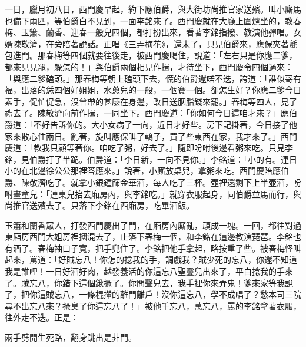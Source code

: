 一日，臘月初八日，西門慶早起，約下應伯爵，與大街坊尚推官家送殯。叫小廝馬也備下兩匹，等伯爵白不見到，一面李銘來了。西門慶就在大廳上圍爐坐的，教春梅、玉簫、蘭香、迎春一般兒四個，都打扮出來，看著李銘指撥、教演他彈唱。女婿陳敬濟，在旁陪著說話。正唱《三弄梅花》，還未了，只見伯爵來，應保夾著氈包進門。那春梅等四個就要往後走，被西門慶喝住，說道：「左右只是你應二爹，都來見見罷，躲怎的！」與伯爵兩個相見作揖，才待坐下，西門慶令四個過來： 「與應二爹磕頭。」那春梅等朝上磕頭下去，慌的伯爵還喏不迭，誇道：「誰似哥有福，出落的恁四個好姐姐，水蔥兒的一般，一個賽一個。卻怎生好？你應二爹今日素手，促忙促急，沒曾帶的甚麼在身邊，改日送胭脂錢來罷。」春梅等四人，見了禮去了。陳敬濟向前作揖，一同坐下。西門慶道：「你如何今日這咱才來？」應伯爵道：「不好告訴你的。大小女病了一向，近日才好些。房下記掛著，今日接了他家來散心住兩日。亂著，旋叫應保叫了轎子，買了些東西在家，我才來了。」西門慶道：「教我只顧等著你。咱吃了粥，好去了。」隨即吩咐後邊看粥來吃。只見李銘，見伯爵打了半跪。伯爵道：「李日新，一向不見你。」李銘道：「小的有。連日小的在北邊徐公公那裡答應來。」說著，小廝放桌兒，拿粥來吃。西門慶陪應伯爵、陳敬濟吃了。就拿小銀鐘篩金華酒，每人吃了三杯。壺裡還剩下上半壺酒，吩咐畫童兒：「連桌兒抬去廂房內，與李銘吃。」就穿衣服起身，同伯爵並馬而行，與尚推官送殯去了。只落下李銘在西廂房，吃畢酒飯。

玉簫和蘭香眾人，打發西門慶出了門，在廂房內廝亂，頑成一塊。一回，都往對過東廂房西門大姐房裡摑混去了，止落下春梅一個，和李銘在這邊教演琵琶。李銘也有酒了。春梅袖口子寬，把手兜住了。李銘把他手拿起，略按重了些。被春梅怪叫起來，罵道：「好賊忘八！你怎的捻我的手，調戲我？賊少死的忘八，你還不知道我是誰哩！一日好酒好肉，越發養活的你這忘八聖靈兒出來了，平白捻我的手來了。賊忘八，你錯下這個鍬撅了。你問聲兒去，我手裡你來弄鬼！爹來家等我說了，把你這賊忘八，一條棍攆的離門離戶！沒你這忘八，學不成唱了？愁本司三院尋不出忘八來？撅臭了你這忘八了！」被他千忘八，萬忘八，罵的李銘拿著衣服，往外走不迭。正是：

兩手劈開生死路，翻身跳出是非門。

